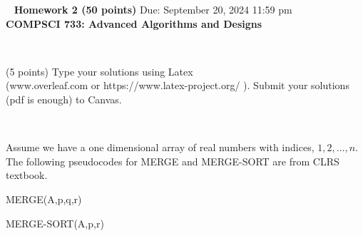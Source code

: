 \documentclass[12pt]{article}
\newcommand{\vs}{\vspace{2mm}}
\newcommand{\ls}{\vspace{5mm}}
\newcommand{\bc}{\begin{center}}
\newcommand{\ec}{\end{center}}
\begin{document}
\bc\ { \bf  Homework  2 (50 points)}  Due: September 20, 2024 11:59 pm\\

 { \bf COMPSCI 733: Advanced Algorithms and Designs } \ec\ 
\ls\

 (5 points)
Type your solutions using Latex \\
(www.overleaf.com or https://www.latex-project.org/ ). Submit your solutions (pdf is enough)  to Canvas. 




\vs\

Assume we have a one dimensional array of real numbers with indices, $1, 2, \ldots, n$. The following pseudocodes for MERGE and MERGE-SORT are from CLRS textbook.


\begin{algorithm}
\caption{MERGE(A,p,q,r)}
\begin{algorithmic}[1]
\For {$i=1$ to $n_1$}
\EndFor
{}
\EndFor
{}
\Else
{}
\EndIf
\EndFor
\end{algorithmic}
\end{algorithm}

\begin{algorithm}
\caption{MERGE-SORT(A,p,r)}
\begin{algorithmic}[1]
\EndIf
\end{algorithmic}
\end{algorithm}
\end{document}
